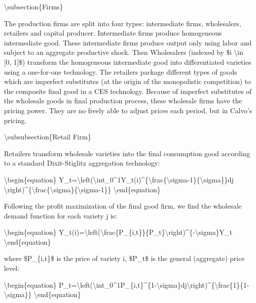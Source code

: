 \documentclass[10pt,math=newtx,citestyle=gb7714-2015,bibstyle=gb7714-2015]{elegantbook}
\begin{document}
	\textbackslash{}subsection\{Firms\}
	
	The production firms are split into four types: intermediate firms, wholesalers, retailers and capital producer. Intermediate firms produce homogeneous intermediate good. These intermediate firms produce output only using labor and subject to an aggregate productive shock. Then Wholesalers (indexed by \$i \textbackslash{}in [0, 1]\$) transform the homogeneous intermediate good into differentiated varieties using a one-for-one technology. The retailers package different types of goods which are imperfect substitutes (at the origin of the monopolistic competition) to the composite final good in a CES technology. Because of imperfect substitutes of the wholesale goods in final production process, these wholesale firms have the pricing power. They are no freely able to adjust prices each period, but in Calvo's pricing.
	
	\textbackslash{}subsubsection\{Retail Firm\}
	
	Retailers transform wholesale varieties into the final consumption good according to a standard Dixit-Stiglitz aggregation technology:
	
	\textbackslash{}begin\{equation\}
	Y\_t=\textbackslash{}left(\textbackslash{}int\_0\^{}1Y\_t(i)\^{}\{\textbackslash{}frac\{\textbackslash{}sigma-1\}\{\textbackslash{}sigma\}\}dj \textbackslash{}right)\^{}\{\textbackslash{}frac\{\textbackslash{}sigma\}\{\textbackslash{}sigma-1\}\}
	\textbackslash{}end\{equation\}
	
	Following the profit maximization of the final good firm, we find the wholesale demand function for each variety j is:
	
	\textbackslash{}begin\{equation\}
	Y\_t(i)=\textbackslash{}left(\textbackslash{}frac\{P\_\{i,t\}\}\{P\_t\}\textbackslash{}right)\^{}\{-\textbackslash{}sigma\}Y\_t
	\textbackslash{}end\{equation\}
	
	where \$P\_\{i,t\}\$ is the price of variety i, \$P\_t\$ is the general (aggregate) price level:
	
	\textbackslash{}begin\{equation\}
	P\_t=\textbackslash{}left(\textbackslash{}int\_0\^{}1P\_\{i,t\}\^{}\{1-\textbackslash{}sigma\}dj\textbackslash{}right)\^{}\{\textbackslash{}frac\{1\}\{1-\textbackslash{}sigma\}\}
	\textbackslash{}end\{equation\}
	
\end{document}
